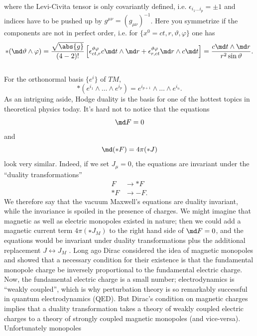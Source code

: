 where the Levi-Civita tensor is only covariantly defined, i.e. $\epsilon_{i_1 \dots i_p} = \pm 1$ and indices have to be pushed up by $g^{\mu \nu} = (g_{\mu \nu})^{-1}$.
Here you symmetrize if the components are not in perfect order, i.e. for $\{x^0=c t ,r,\vartheta, \varphi\}$ one has
\begin{equation}
	*(\md \vartheta \wedge \varphi) = \frac{\sqrt{\abs{g}}}{(4-2)!} \left[\epsilon^{\vartheta \varphi}_{ct,r} c \md t\wedge \md r + \epsilon^{\vartheta \varphi}_{r,ct} \md r\wedge c\md t\right]=\frac{c \md t \wedge \md r}{r^2 \sin\vartheta}.
\end{equation}\\
For the orthonormal basis $\{e^i\}$ of $TM$,
\begin{equation}
	*(e^{i_1} \wedge\dots \wedge e^{i_p}) = e^{i_{p+1}} \wedge \dots \wedge e^{i_n}.
\end{equation}
As an intriguing aside, Hodge duality is the basis for one of the hottest topics in theoretical
physics today. It’s hard not to notice that the equations 
\begin{equation}
\md F = 0
\end{equation}
and 
\begin{equation}
\md (*F) = 4 \pi (* J)
\end{equation} look very similar.
Indeed, if we set $J_μ = 0$, the equations are invariant under the “duality transformations”
\begin{align*}
	F &\rightarrow *F\\
	*F & \rightarrow -F.
\end{align*}
We therefore say that the vacuum Maxwell’s equations are duality invariant, while the invariance is spoiled in the presence of charges. We might imagine that magnetic as well as electric monopoles existed in nature; then we could add a magnetic current term $4π(∗J_M )$ to the
right hand side of $\md F=0$, and the equations would be invariant under duality transformations
plus the additional replacement $J ↔ J_M$ . Long
ago Dirac considered the idea of magnetic monopoles and showed that a necessary condition
for their existence is that the fundamental monopole charge be inversely proportional to the fundamental electric charge. Now, the fundamental electric charge is a small number;
electrodynamics is “weakly coupled”, which is why perturbation theory is so remarkably
successful in quantum electrodynamics (QED). But Dirac’s condition on magnetic charges
implies that a duality transformation takes a theory of weakly coupled electric charges to a
theory of strongly coupled magnetic monopoles (and vice-versa). Unfortunately monopoles
